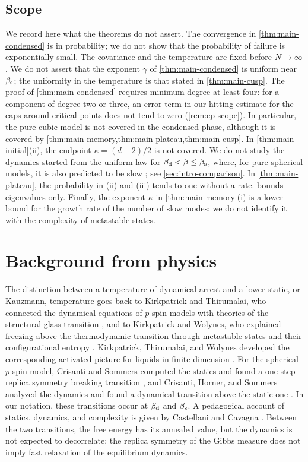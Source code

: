 \subsection{Scope}\label{sec:intro-scope}

We record here what the theorems do not assert. The convergence in \cref{thm:main-condensed} is in probability; we do not show that the probability of failure is exponentially small. The covariance and the temperature are fixed before $N\to\infty$. We do not assert that the exponent $\gamma$ of \cref{thm:main-condensed} is uniform near $\beta_{\mathrm s}$; the uniformity in the temperature is that stated in \cref{thm:main-cusp}. The proof of \cref{thm:main-condensed} requires minimum degree at least four: for a component of degree two or three, an error term in our hitting estimate for the caps around critical points does not tend to zero (\cref{rem:cp-scope}). In particular, the pure cubic model is not covered in the condensed phase, although it is covered by \cref{thm:main-memory,thm:main-plateau,thm:main-cusp}. In \cref{thm:main-initial}(ii), the endpoint $\kappa=(d-2)/2$ is not covered. We do not study the dynamics started from the uniform law for $\beta_{\mathrm d}<\beta\le\beta_{\mathrm s}$, where, for pure spherical models, it is also predicted to be slow \cite[arXiv v1, Section~2.5, Conjecture~6]{BenArousJagannath2024}; see \cref{sec:intro-comparison}. In \cref{thm:main-plateau}, the probability in (ii) and (iii) tends to one without a rate.  bounds eigenvalues only. Finally, the exponent $\kappa$ in \cref{thm:main-memory}(i) is a lower bound for the growth rate of the number of slow modes; we do not identify it with the complexity of metastable states.

\section{Background from physics}\label{sec:intro-physics}

The distinction between a temperature of dynamical arrest and a lower static, or Kauzmann, temperature goes back to Kirkpatrick and Thirumalai, who connected the dynamical equations of $p$-spin models with theories of the structural glass transition \cite{KirkpatrickThirumalai1987}, and to Kirkpatrick and Wolynes, who explained freezing above the thermodynamic transition through metastable states and their configurational entropy \cite{KirkpatrickWolynes1987}. Kirkpatrick, Thirumalai, and Wolynes developed the corresponding activated picture for liquids in finite dimension \cite{KirkpatrickThirumalaiWolynes1989}. For the spherical $p$-spin model, Crisanti and Sommers computed the statics and found a one-step replica symmetry breaking transition \cite{CrisantiSommers1992}, and Crisanti, Horner, and Sommers analyzed the dynamics and found a dynamical transition above the static one \cite{CrisantiHornerSommers1993}. In our notation, these transitions occur at $\beta_{\mathrm d}$ and $\beta_{\mathrm s}$. A pedagogical account of statics, dynamics, and complexity is given by Castellani and Cavagna \cite{CastellaniCavagna2005}. Between the two transitions, the free energy has its annealed value, but the dynamics is not expected to decorrelate: the replica symmetry of the Gibbs measure does not imply fast relaxation of the equilibrium dynamics.

